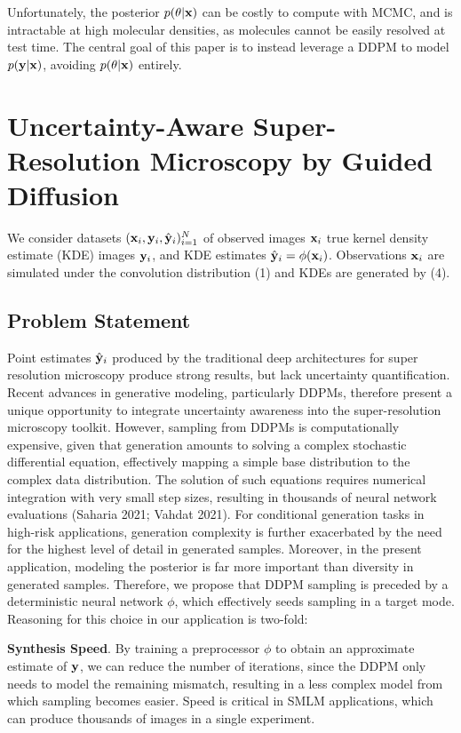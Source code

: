 \documentclass{article}
\begin{document}
Unfortunately, the posterior $p(\theta|\bold{x})$ can be costly to compute with MCMC, and is intractable at high molecular densities, as molecules cannot be easily resolved at test time. The central goal of this paper is to instead leverage a DDPM to model $p(\bold{y}|\bold{x})$, avoiding $p(\theta|\bold{x})$ entirely.

\section{Uncertainty-Aware Super-Resolution Microscopy by Guided Diffusion}

We consider datasets $(\bold{x}_i,\bold{y}_i,\hat{\bold{y}}_{i})_{i=1}^{N}$ of observed images $\bold{x}_i$ true kernel density estimate (KDE) images $\bold{y}_{i}$, and KDE estimates $\hat{\bold{y}}_{i}=\phi(\bold{x}_{i})$. Observations $\bold{x}_i$ are simulated under the convolution distribution (1) and KDEs are generated by (4).

\subsection{Problem Statement}

Point estimates $\hat{\bold{y}}_{i}$ produced by the traditional deep architectures for super resolution microscopy produce strong results, but lack uncertainty quantification. Recent advances in generative modeling, particularly DDPMs, therefore present a unique opportunity to integrate uncertainty awareness into the super-resolution microscopy toolkit. However, sampling from DDPMs is computationally expensive, given that generation amounts to solving a complex stochastic differential equation, effectively mapping a simple base distribution to the complex data distribution. The solution of such equations requires numerical integration with very small step sizes, resulting in thousands of neural network evaluations (Saharia 2021; Vahdat 2021). For conditional generation tasks in high-risk applications, generation complexity is further exacerbated by the need for the highest level of detail in generated samples. Moreover, in the present application, modeling the posterior is far more important than diversity in generated samples. Therefore, we propose that DDPM sampling is preceded by a deterministic neural network $\phi$, which effectively seeds sampling in a target mode. Reasoning for this choice in our application is two-fold:

\textbf{Synthesis Speed}. By training a preprocessor $\phi$ to obtain an approximate estimate of $\bold{y}$, we can reduce the number of iterations, since the DDPM only needs to model the remaining mismatch, resulting in a less complex model from which sampling becomes easier. Speed is critical in SMLM applications, which can produce thousands of images in a single experiment.\\
\end{document}
